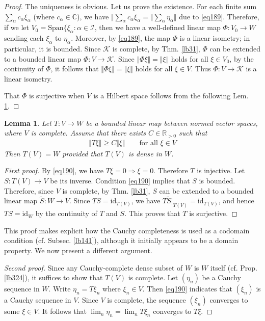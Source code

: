 \documentclass[12pt,b5paper,notitlepage]{article}
\theoremstyle{definition}
\theoremstyle{plain}
\newtheorem{lm}[df]{Lemma}
\newcommand{\wtd}{\widetilde}
\newcommand{\id}{\mathrm{id}}
\newcommand{\Span}{\mathrm{Span}}
\newcommand{\Cbb}{\mathbb C}
\newcommand{\Rbb}{\mathbb R}
\newcommand{\MK}{\mathcal K}
\newcommand{\SI}{\mathscr I}
\numberwithin{equation}{section}
\begin{document}
\begin{proof}
The uniqueness is obvious. Let us prove the existence. For each finite sum $\sum_\alpha c_\alpha\xi_\alpha$ (where $c_\alpha\in\Cbb$), we have $\Vert\sum_\alpha c_\alpha\xi_\alpha=\Vert\sum_\alpha\eta_\alpha\Vert$ due to \eqref{eq189}. Therefore, if we let $V_0=\Span\{\xi_\alpha:\alpha\in\SI$, then we have a well-defined linear map $\Phi:V_0\rightarrow W$ sending each $\xi_\alpha$ to $\eta_\alpha$. Moreover, by \eqref{eq189}, the map $\Phi$ is a linear isometry; in particular, it is bounded. Since $\MK$ is complete, by Thm. \ref{lb31}, $\Phi$ can be extended to a bounded linear map $\Phi:V\rightarrow\MK$. Since $\Vert\Phi\xi\Vert=\Vert\xi\Vert$ holds for all $\xi\in V_0$, by the continuity of $\Phi$, it follows that $\Vert\Phi\xi\Vert=\Vert\xi\Vert$ holds for all $\xi\in V$. Thus $\Phi:V\rightarrow\MK$ is a linear isometry.

That $\Phi$ is surjective when $V$ is a Hilbert space follows from the following Lem. \ref{lb367}.
\end{proof}


\begin{lm}\label{lb367}
Let $T:V\rightarrow W$ be a bounded linear map between normed vector spaces, where $V$ is complete. Assume that there exists $C\in\Rbb_{>0}$ such that
\begin{align}\label{eq190}
\Vert T\xi\Vert\geq C\Vert\xi\Vert\qquad\text{for all }\xi\in V
\end{align}
Then $T(V)=W$ provided that $T(V)$ is dense in $W$.
\end{lm}


\begin{proof}[First proof]
By \eqref{eq190}, we have $T\xi=0\Rightarrow\xi=0$. Therefore $T$ is injective. Let $S:T(V)\rightarrow V$ be its inverse. Condition \eqref{eq190} implies that $S$ is bounded. Therefore, since $V$ is complete, by Thm. \ref{lb31}, $S$ can be extended to a bounded linear map $\wtd S:W\rightarrow V$. Since $TS=\id_{T(V)}$, we have $T\wtd S|_{T(V)}=\id_{T(V)}$, and hence $TS=\id_W$ by the continuity of $T$ and $S$. This proves that $T$ is surjective.
\end{proof}

This proof makes explicit how the Cauchy completeness is used as a codomain condition (cf. Subsec. \ref{lb141}), although it initially appears to be a domain property. We now present a different argument.

\begin{proof}[Second proof]
Since any Cauchy-complete dense subset of $W$ is $W$ itself (cf. Prop. \ref{lb324}), it suffices to show that $T(V)$ is complete. Let $(\eta_n)$ be a Cauchy sequence in $W$. Write $\eta_n=T\xi_n$ where $\xi_n\in V$. Then \eqref{eq190} indicates that $(\xi_n)$ is a Cauchy sequence in $V$. Since $V$ is complete, the sequence $(\xi_n)$ converges to some $\xi\in V$. It follows that $\lim_n\eta_n=\lim_n T\xi_n$ converges to $T\xi$.
\end{proof}
\end{document}
